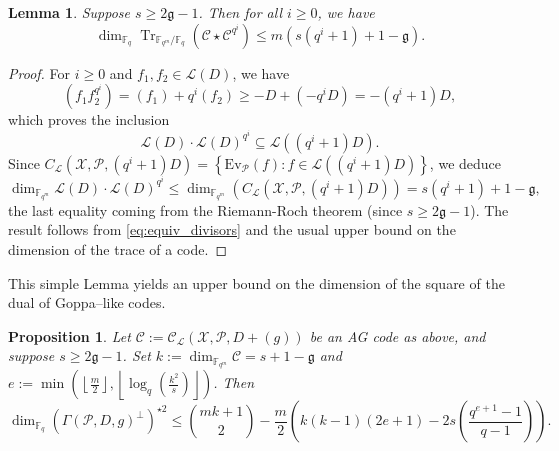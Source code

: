 \documentclass[a4paper]{article}
\newtheorem{proposition}[thm]{Proposition}
\newtheorem{lemma}[thm]{Lemma}
\theoremstyle{definition}
\theoremstyle{remark}
\newcommand{\calP}{\mathcal{P}}
\newcommand{\calL}{\mathcal{L}}
\newcommand{\calC}{\mathcal{C}}
\newcommand{\calX}{\mathcal{X}}
\newcommand{\fqm}{\mathbb{F}_{q^m}}
\newcommand{\fq}{\mathbb{F}_{q}}
\newcommand{\Tr}[1]{\operatorname{Tr}_{\mathbb{F}_{q^m}/\fq}\left(#1\right)}
\newcommand{\set}[1]{\left\{#1\right\}}
\begin{document}
\begin{lemma} \label{lem:bound_dim_Tr(C*C^q^i)}
  Suppose $s \geq 2\mathfrak{g}-1$. Then for all $i \geq 0$, we have 
   $$\dim_{\fq} \Tr{\calC\star \calC^{q^i}} \leq m\left(s\left(q^i+1\right)+1-\mathfrak{g}\right).$$
\end{lemma}
\begin{proof}
For $i \geq 0$ and $f_1,f_2 \in \calL(D)$, we have 
$$(f_1f_2^{q^i}) = (f_1)+q^i(f_2) \geq -D +(-q^iD) = -(q^i+1)D,$$
which proves the inclusion
$$ \calL(D)\cdot \calL(D)^{q^i} \subseteq \calL((q^i+1)D).$$
Since $C_{\calL}(\calX,\calP,(q^i+1)D) = \set{\mathrm{Ev}_{\calP}(f) : f \in \calL((q^i+1)D)}$, we deduce 
$$ \dim_{\fqm} \calL(D) \cdot \calL(D)^{q^i} \leq \dim_{\fqm}\left(C_{\calL}(\calX,\calP,(q^i+1)D)\right) = s(q^i+1)+1-\mathfrak{g},$$
the last equality coming from the Riemann-Roch theorem (since $s \geq 2\mathfrak{g}-1$). The result follows from \eqref{eq:equiv_divisors} and the usual upper bound on the dimension of the trace of a code. 
\end{proof}
\noindent This simple Lemma yields an upper bound on the dimension of the square of the dual of Goppa--like codes.
\begin{proposition} \label{prop:bound_dim_using_inclusions}
    Let $\calC := \calC_{\calL}(\calX,\calP,D+(g))$ be an AG code as above, and suppose $s \geq 2\mathfrak{g}-1$. Set $k := \dim_{\fqm}\calC = s+1-\mathfrak{g}$ and  $e := \min\left(\left\lfloor \frac{m}{2} \right\rfloor,\left\lfloor \log_q\left(\frac{k^2}{s}\right)\right\rfloor\right)$. Then
    $$\dim_{\fq} (\Gamma(\calP,D,g)^{\perp})^{\star 2} \leq \binom{mk+1}{2} - \dfrac{m}{2}\left(k(k-1)(2e+1)-2s\left(\dfrac{q^{e+1}-1}{q-1}\right)\right).$$
\end{proposition}
\end{document}
